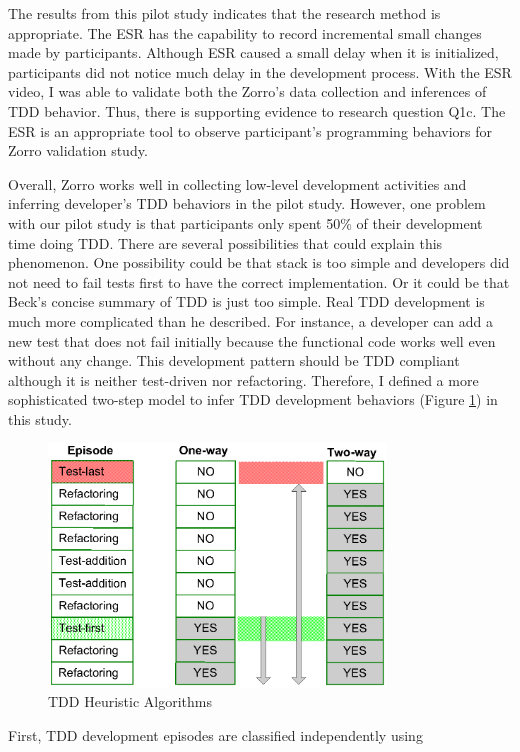 The results from this pilot study indicates that the research method is
appropriate. The ESR has the capability to record incremental small
changes made by participants. Although ESR caused a small delay
when it is initialized, participants did not notice much
delay in the development process. With the ESR video, I was able to
validate both the Zorro's data collection and inferences of TDD
behavior. Thus, there is supporting evidence to research question
Q1c. The ESR is an appropriate tool to observe participant's
programming behaviors for Zorro validation study.

Overall, Zorro works well in collecting low-level development
activities and inferring developer's TDD behaviors in the pilot
study. However, one problem with our pilot study is that participants
only spent 50\% of their development time doing TDD. There are several
possibilities that could explain this phenomenon. One possibility
could be that stack is too simple and developers did not need to fail
tests first to have the correct implementation. Or it could be that
Beck's concise summary of TDD is just too simple. Real TDD
development is much more complicated than he described. For instance,
a developer can add a new test that does not fail initially because
the functional code works well even without any change. This
development pattern should be TDD compliant although it is neither
test-driven nor refactoring. Therefore, I defined a more sophisticated
two-step model to infer TDD development behaviors (Figure
\ref{fig:heuristic}) in this study.
\begin{figure}[htbp]
  \centering
  \includegraphics[width=0.8\textwidth]{figs/HeuristicAlgorithms}
  \caption{TDD Heuristic Algorithms}\label{fig:heuristic}
\end{figure}
First, TDD development episodes are classified independently using
